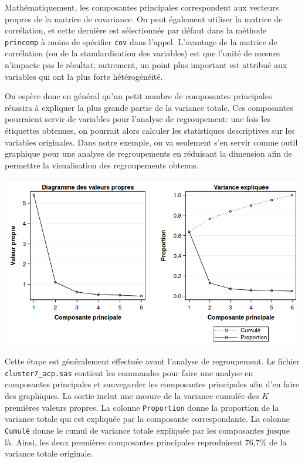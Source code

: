 \documentclass[
  11pt,
  letterpaper,
]{book}
\theoremstyle{definition}
\theoremstyle{definition}
\theoremstyle{definition}
\theoremstyle{remark}
\begin{document}
Mathématiquement, les composantes principales correspondent aux vecteurs propres de la matrice de covariance. On peut également utiliser la matrice de corrélation, et cette dernière est sélectionnée par défaut dans la méthode \texttt{princomp} à moins de spécifier \texttt{cov} dans l'appel. L'avantage de la matrice de corrélation (ou de la standardisation des variables) est que l'unité de mesure n'impacte pas le résultat; autrement, un point plus important est attribué aux variables qui ont la plus forte hétérogénéité.

On espère donc en général qu'un petit nombre de composantes principales réussira à expliquer la plus grande partie de la variance totale. Ces composantes pourraient servir de variables pour l'analyse de regroupement: une fois les étiquettes obtenues, on pourrait alors calculer les statistiques descriptives sur les variables originales. Dans notre exemple, on va seulement s'en servir comme outil graphique pour une analyse de regroupements en réduisant la dimension afin de permettre la visualisation des regroupements obtenus.

\begin{center}\includegraphics[width=0.8\linewidth]{figures/04-clustering-e18} \end{center}

Cette étape est généralement effectuée avant l'analyse de regroupement.
Le fichier \texttt{cluster7\_acp.sas} contient les commandes pour faire une analyse en composantes principales et sauvegarder les composantes principales afin d'en faire des graphiques. La sortie inclut une mesure de la variance cumulée des \(K\) premières valeurs propres. La colonne \texttt{Proportion} donne la proportion de la variance totale qui est expliquée par la composante correspondante. La colonne \texttt{Cumulé} donne le cumul de variance totale expliquée par les composantes jusque là. Ainsi, les deux premières composantes principales reproduisent 76,7\% de la variance totale originale.
\end{document}
